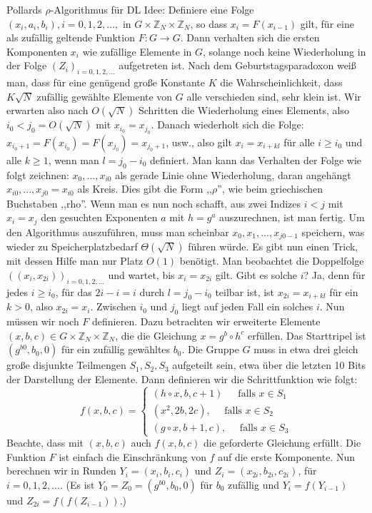 \documentclass[a4paper]{article}
\begin{document}
\begin{multicols}{3}
        Pollards ${\rho}$-Algorithmus für DL
        Idee: Definiere eine Folge $(x_i,a_i,b_i),i= 0,1,2,...,$ in $G\times\mathbb{Z}_N\times\mathbb{Z}_N$, so dass $x_i=F(x_{i-1})$ gilt, für eine als zufällig geltende Funktion $F:G\rightarrow G$. Dann verhalten sich die ersten Komponenten $x_i$ wie zufällige Elemente in $G$, solange noch keine Wiederholung in der Folge $(Z_i)_{i=0, 1 , 2 ,...}$ aufgetreten ist. Nach dem Geburtstagsparadoxon weiß man, dass für eine genügend große Konstante $K$ die Wahrscheinlichkeit, dass $K\sqrt{N}$ zufällig gewählte Elemente von $G$ alle verschieden sind, sehr klein ist. Wir erwarten also nach $O(\sqrt{N})$ Schritten die Wiederholung eines Elements, also $i_0< j_0=O(\sqrt{N})$ mit $x_{i_0}= x_{j_0}$. Danach wiederholt sich die Folge: $x_{i_0 +1}= F(x_{i_0}) =F(x_{j_0}) = x_{j_0 +1}$, usw., also gilt $x_i=x_{i+kl}$ für alle $i\geq i_0$ und alle $k\geq 1$, wenn man $l=j_0 -i_0$ definiert. Man kann das Verhalten der Folge wie folgt zeichnen: $x_0,...,x_{i0}$ als gerade Linie ohne Wiederholung, daran angehängt $x_{i0},...,x_{j0}=x_{i0}$ als Kreis. Dies gibt die Form ,,${\rho}$'', wie beim griechischen Buchstaben ,,rho''. Wenn man es nun noch schafft, aus zwei Indizes $i < j$ mit $x_i=x_j$ den gesuchten Exponenten $a$ mit $h=g^a$ auszurechnen, ist man fertig.
        Um den Algorithmus auszuführen, muss man scheinbar $x_0,x_1,...,x_{j0-1}$ speichern, was wieder zu Speicherplatzbedarf $\Theta (\sqrt{N})$ führen würde. Es gibt nun einen Trick, mit dessen Hilfe man nur Platz $O(1)$ benötigt. Man beobachtet die Doppelfolge $((x_i,x_{2i}))_{i=0, 1 , 2 ,...}$ und wartet, bis $x_i= x_{2i}$ gilt. Gibt es solche $i$? Ja, denn für jedes $i\geq i_0$, für das $2i-i=i$ durch $l=j_0-i_0$ teilbar ist, ist $x_{2i}=x_{i+kl}$ für ein $k>0$, also $x_{2i}=x_i$. Zwischen $i_0$ und $j_0$ liegt auf jeden Fall ein solches $i$. Nun müssen wir noch $F$ definieren. Dazu betrachten wir erweiterte Elemente $(x,b,c)\in G\times\mathbb{Z}_N \times\mathbb{Z}_N$, die die Gleichung $x=g^b \circ h^c$ erfüllen. Das Starttripel ist $(g^{b0},b_0,0)$ für ein zufällig gewähltes $b_0$. Die Gruppe $G$ muss in etwa drei gleich große disjunkte Teilmengen $S_1,S_2,S_3$ aufgeteilt sein, etwa über die letzten 10 Bits der Darstellung der Elemente. Dann definieren wir die Schrittfunktion wie folgt:
        $$f(x,b,c) =\begin{cases} (h\circ x,b,c+1)\,\quad\text{ falls }x\in S_1\\ (x^2, 2b, 2c),\quad\text{ falls }x\in S_2\\ (g\circ x,b+1,c),\quad\text{ falls } x\in S_3 \end{cases}$$
        Beachte, dass mit $(x,b,c)$ auch $f(x,b,c)$ die geforderte Gleichung erfüllt. Die Funktion $F$ ist einfach die Einschränkung von $f$ auf die erste Komponente.
        Nun berechnen wir in Runden $Y_i= (x_i,b_i,c_i)$ und $Z_i= (x_{2i},b_{2i},c_{2i})$, für $i=0,1,2,....$ (Es ist $Y_0=Z_0=(g^{b0},b_0,0)$ für $b_0$ zufällig und $Y_i=f(Y_{i-1})$ und $Z_{2i}=f(f(Z_{i-1}))$.)


\end{multicols}
\end{document}
